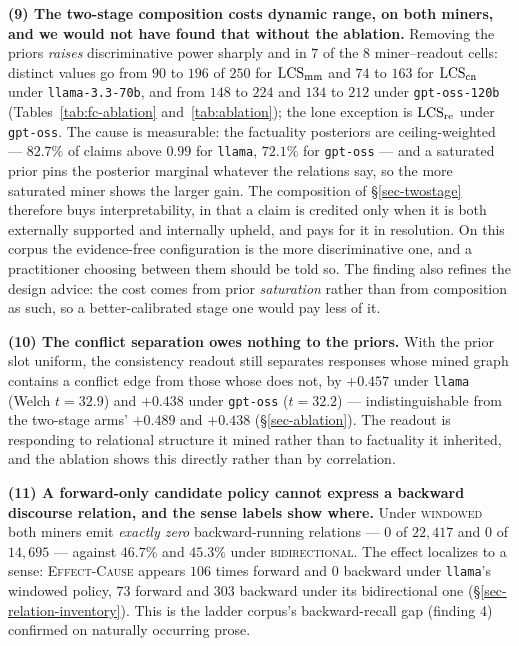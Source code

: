 \textbf{(9) The two-stage composition costs dynamic range, on both miners, and we would not have found
that without the ablation.} Removing the priors \emph{raises} discriminative power sharply and in
$7$ of the $8$ miner--readout cells: distinct values go from $90$ to $196$ of $250$ for $\mathrm{LCS}_{\mathrm{mm}}$
and $74$ to $163$ for $\mathrm{LCS}_{\mathrm{cn}}$ under \texttt{llama-3.3-70b}, and from $148$ to $224$ and $134$ to
$212$ under \texttt{gpt-oss-120b} (Tables~\ref{tab:fc-ablation} and~\ref{tab:ablation}); the lone
exception is $\mathrm{LCS}_{\mathrm{re}}$ under \texttt{gpt-oss}. The cause is measurable: the factuality posteriors are
ceiling-weighted --- $82.7\%$ of claims above $0.99$ for \texttt{llama}, $72.1\%$ for \texttt{gpt-oss} ---
and a saturated prior pins the posterior marginal whatever the relations say, so the more saturated miner
shows the larger gain. The composition of \S\ref{sec-twostage} therefore buys interpretability, in that a
claim is credited only when it is both externally supported and internally upheld, and pays for it in
resolution. On this corpus the evidence-free configuration is the more discriminative one, and a
practitioner choosing between them should be told so. The finding also refines the design advice: the
cost comes from prior \emph{saturation} rather than from composition as such, so a better-calibrated
stage one would pay less of it.

\textbf{(10) The conflict separation owes nothing to the priors.} With the prior slot uniform, the
consistency readout still separates responses whose mined graph contains a conflict edge from those
whose does not, by $+0.457$ under \texttt{llama} (Welch $t = 32.9$) and $+0.438$ under \texttt{gpt-oss}
($t = 32.2$) --- indistinguishable from the two-stage arms' $+0.489$ and $+0.438$
(\S\ref{sec-ablation}). The readout is responding to relational structure it mined rather than to
factuality it inherited, and the ablation shows this directly rather than by correlation.

\textbf{(11) A forward-only candidate policy cannot express a backward discourse relation, and the
sense labels show where.} Under \textsc{windowed} both miners emit \emph{exactly zero}
backward-running relations --- $0$ of $22{,}417$ and $0$ of $14{,}695$ --- against $46.7\%$ and
$45.3\%$ under \textsc{bidirectional}. The effect localizes to a sense: \textsc{Effect-Cause} appears
$106$ times forward and $0$ backward under \texttt{llama}'s windowed policy, $73$ forward and $303$
backward under its bidirectional one (\S\ref{sec-relation-inventory}). This is the ladder corpus's
backward-recall gap (finding 4) confirmed on naturally occurring prose.

